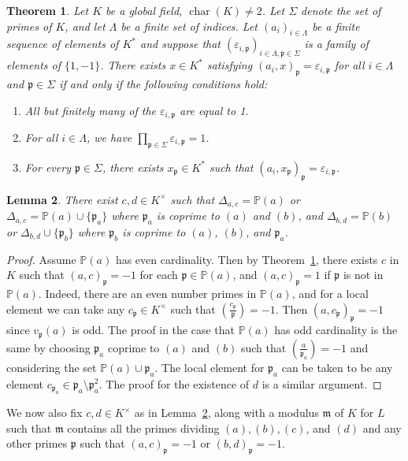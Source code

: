 \documentclass[12pt,reqno]{amsart}
\newcommand{\mm}{\mathfrak{m}}
\newcommand{\pp}{\mathfrak{p}}
\newcommand{\PP}{\mathbb{P}}
\DeclareMathOperator{\ch}{char}
\newtheorem{thm}{Theorem}[section]
\newtheorem{lem}[thm]{Lemma}
\theoremstyle{definition}
\begin{document}
\begin{thm}\cite[Theorem 3.7]{Park}\label{prescribesymbols}
Let $K$ be a global field, $\ch(K)\not=2$. Let $\Sigma$ denote the set
of primes of $K$, 
and let $\Lambda$ be a finite set of indices. Let $(a_i)_{i\in
  \Lambda}$ be a finite sequence of elements of $K^*$ and suppose that
$(\varepsilon_{i,\pp})_{i\in \Lambda, \pp\in \Sigma}$ is a family of
elements of $\{1,-1\}$. There exists $x\in K^*$ satisfying
$(a_i,x)_{\pp}=\varepsilon_{i,\pp}$ for all $i\in \Lambda$
and $\pp\in \Sigma$ if and only if the following conditions hold:
\begin{enumerate}
\item All but finitely many of the $\varepsilon_{i,\pp}$ are equal to
  1.
\item For all $i\in \Lambda$, we have $\prod_{\pp\in \Sigma}
  \varepsilon_{i,\pp}=1$. 
\item For every $\pp\in \Sigma$, there exists $x_{\pp}\in K^*$ such
  that $(a_i,x_{\pp})_{\pp}=\varepsilon_{i,\pp}$. 
\end{enumerate}
\end{thm}



\begin{lem}\label{choosec,d}
There exist $c,d\in K^{\times}$ such that $\Delta_{a,c}=\PP(a)$ or
$\Delta_{a,c}=\PP(a)\cup \{\pp_a\}$ where $\pp_a$ is coprime to $(a)$
and $(b)$, and $\Delta_{b,d} =
\PP(b)$ or $\Delta_{b,d} \cup \{\pp_b\}$ where $\pp_b$ is coprime to
$(a)$, $(b)$, and $\pp_a$. 
\end{lem}
\begin{proof}
  Assume $\PP(a)$ has even cardinality. Then by
  Theorem~\ref{prescribesymbols}, there exists $c$ in $K$ such that
  $(a,c)_{\pp}=-1$ for each $\pp\in \PP(a)$, and $(a,c)_{\pp}=1$ if
  $\pp$ is not in $\PP(a)$. Indeed, there
  are an even number primes in $\PP(a)$, and for a local element we can
  take any $c_{\pp} \in K^{\times}$ such that
  $\left(\frac{c_{\pp}}{\pp}\right)=-1$. Then $(a,c_{\pp})_{\pp}=-1$
  since $v_{\pp}(a)$ is odd. The proof in the case that $\PP(a)$ has
  odd cardinality is the same by choosing $\pp_a$ coprime to $(a)$ and
  $(b)$ such that $\left(\frac{a}{\pp_a}\right)=-1$ and considering
  the set $\PP(a)\cup \pp_a$. The local element for $\pp_a$ can be
  taken to be any element $c_{\pp_a}\in \pp_a\setminus\pp_a^2$. The
  proof for the existence of $d$ is a similar argument.
\end{proof}

We now also fix $c,d\in K^{\times}$ as in Lemma~\ref{choosec,d}, along
with a modulus $\mm$ of $K$ for $L$ such that $\mm$ contains all the
primes dividing $(a),(b),(c)$, and $(d)$ and any other primes $\pp$
such that $(a,c)_{\pp}=-1$ or $(b,d)_{\pp}=-1$. 
\end{document}
